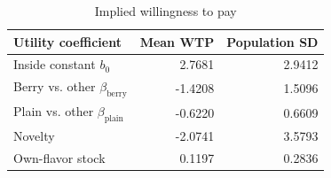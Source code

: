\begin{table}[htbp]\centering\small
\caption{Implied willingness to pay}
\label{tab:implied-wtp}
\begin{tabular}{lrr}\toprule
Utility coefficient & Mean WTP & Population SD \\
\midrule
Inside constant $b_0$ & 2.7681 & 2.9412 \\
Berry vs. other $\beta_{\mathrm{berry}}$ & -1.4208 & 1.5096 \\
Plain vs. other $\beta_{\mathrm{plain}}$ & -0.6220 & 0.6609 \\
Novelty & -2.0741 & 3.5793 \\
Own-flavor stock & 0.1197 & 0.2836 \\
\bottomrule\end{tabular}
\end{table}
